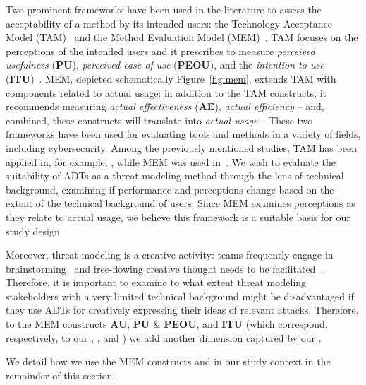 Two prominent frameworks have been used in the literature to assess the acceptability of a method by its intended users: the Technology Acceptance Model (TAM)~\cite{davisPerceivedUsefulnessPerceived1989} and the Method Evaluation Model (MEM)~\cite{moodyMethodEvaluationModel2003}. TAM focuses on the perceptions of the intended users and it prescribes to measure \emph{perceived usefulness} (\textbf{PU}), \emph{perceived ease of use} (\textbf{PEOU}), and the \emph{intention to use} (\textbf{ITU})~\cite{davisPerceivedUsefulnessPerceived1989}. MEM, depicted schematically Figure~\ref{fig:mem}, extends TAM with components related to actual usage: in addition to the TAM constructs, it recommends measuring \emph{actual effectiveness} (\textbf{AE}), \emph{actual efficiency}  -- and, combined, these constructs will translate into \emph{actual usage}~\cite{moodyMethodEvaluationModel2003}. These two frameworks have been used for evaluating tools and methods in a variety of fields, including cybersecurity. Among the previously mentioned studies, TAM has been applied in, for example, \cite{tondel2019understanding,opdahlExperimentalComparisonAttack2009,karpatiComparingAttackTrees2014,kattaComparingTwoTechniques2010,bernsmed2022adopting}, while MEM was used in~\cite{labunetsFirstEmpiricalEvaluation2014a,labunetsSecurityRiskAssessment,stevens2018battle,broccia_assessing_2024,broccia2025evaluating}. We wish to evaluate the suitability of ADTs as a threat modeling method through the lens of technical background, examining if performance and perceptions change based on the extent of the technical background of users. Since MEM examines perceptions as they relate to actual usage, we believe this framework is a suitable basis for our study design. 

 
Moreover, threat modeling is a creative activity: teams frequently engage in brainstorming~\cite{brunner2020risk} and free-flowing creative thought needs to be facilitated~\cite{thompson2024there}.
Therefore, it is important to examine to what extent threat modeling stakeholders with a very limited technical background might be disadvantaged if they use ADTs for creatively expressing their ideas of relevant attacks. Therefore, to the MEM constructs \textbf{AU}, \textbf{PU} \& \textbf{PEOU}, and \textbf{ITU} (which correspond, respectively, to our , , and ) we add another dimension captured by our . 

We detail how we use the MEM constructs and  in our study context in the remainder of this section.

